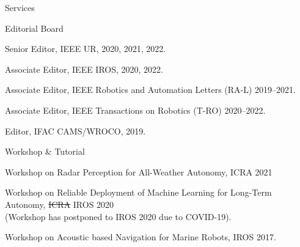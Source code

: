 \begin{rSection}{Services}
\begin{rSubsection}{Editorial Board}{}{}{}
  \item Senior Editor, IEEE UR, 2020, 2021, 2022.
  \item Associate Editor, IEEE IROS, 2020, 2022.
  \item Associate Editor, IEEE Robotics and Automation Letters (RA-L) 2019--2021.
  \item Associate Editor, IEEE Transactions on Robotics (T-RO) 2020--2022.
  \item Editor, IFAC CAMS/WROCO, 2019.
\end{rSubsection}

\newpage
\begin{rSubsection}{Workshop \& Tutorial}{}{}{}
  \item Workshop on Radar Perception for All-Weather Autonomy, ICRA 2021
  \item Workshop on Reliable Deployment of Machine Learning for Long-Term Autonomy, \sout{ICRA} IROS 2020\\
  (Workshop has postponed to IROS 2020 due to COVID-19).
  \item Workshop on Acoustic based Navigation for Marine Robots, IROS 2017.
\end{rSubsection}


\end{rSection}
